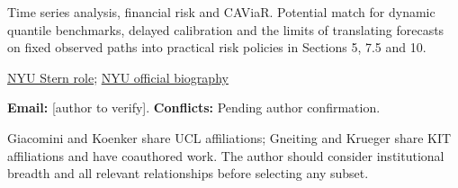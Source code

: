 \documentclass[11pt,a4paper]{article}
\begin{document}
Time series analysis, financial risk and CAViaR. Potential match for dynamic quantile benchmarks, delayed calibration and the limits of translating forecasts on fixed observed paths into practical risk policies in Sections 5, 7.5 and 10.

\href{https://execed.stern.nyu.edu/pages/robert-engle}{NYU Stern role}; \href{https://web-static.stern.nyu.edu/rengle/about/}{NYU official biography}

\textbf{Email:} [author to verify]. \textbf{Conflicts:} Pending author confirmation.

Giacomini and Koenker share UCL affiliations; Gneiting and Krueger share KIT affiliations and have coauthored work. The author should consider institutional breadth and all relevant relationships before selecting any subset.
\end{document}
